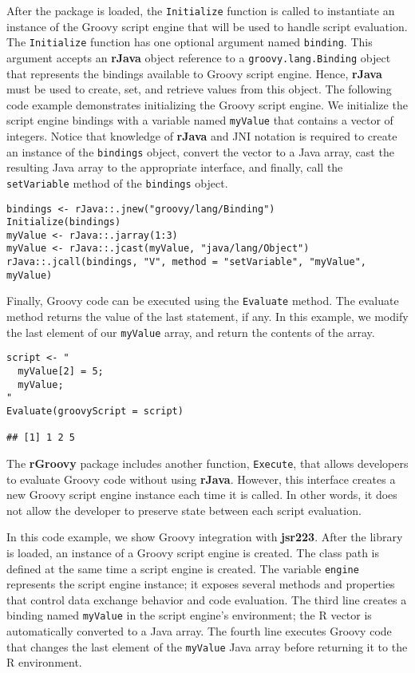 \documentclass[
article,
11pt, %
a4paper, %
oneside, %
headinclude,footinclude, %
]{scrartcl}
\theoremstyle{definition} %
\theoremstyle{plain} %
\theoremstyle{remark} %
\newcommand{\pkg}[1]{\textbf{#1}}
\newcommand{\code}[1]{\texttt{#1}}
\begin{document}
After the package is loaded, the \code{Initialize} function is called to instantiate an instance of the Groovy script engine that will be used to handle script evaluation. The \code{Initialize} function has one optional argument named \code{binding}. This argument accepts an \pkg{rJava} object reference to a \code{groovy.lang.Binding} object that represents the bindings available to Groovy script engine. Hence, \pkg{rJava} must be used to create, set, and retrieve values from this object. The following code example demonstrates initializing the Groovy script engine. We initialize the script engine bindings with a variable named \code{myValue} that contains a vector of integers. Notice that knowledge of \pkg{rJava} and JNI notation is required to create an instance of the \code{bindings} object, convert the vector to a Java array, cast the resulting Java array to the appropriate interface, and finally, call the \code{setVariable} method of the \code{bindings} object.

\begin{verbatim}
bindings <- rJava::.jnew("groovy/lang/Binding")
Initialize(bindings)
myValue <- rJava::.jarray(1:3)
myValue <- rJava::.jcast(myValue, "java/lang/Object")
rJava::.jcall(bindings, "V", method = "setVariable", "myValue", myValue)
\end{verbatim}

Finally, Groovy code can be executed using the \code{Evaluate} method. The evaluate method returns the value of the last statement, if any. In this example, we modify the last element of our \code{myValue} array, and return the contents of the array.

\begin{verbatim}
script <- "
  myValue[2] = 5;
  myValue;
"
Evaluate(groovyScript = script)

## [1] 1 2 5
\end{verbatim}

The \pkg{rGroovy} package includes another function, \code{Execute}, that allows developers to evaluate Groovy code without using \pkg{rJava}. However, this interface creates a new Groovy script engine instance each time it is called. In other words, it does not allow the developer to preserve state between each script evaluation.

In this code example, we show Groovy integration with \pkg{jsr223}. After the library is loaded, an instance of a Groovy script engine is created. The class path is defined at the same time a script engine is created. The variable \code{engine} represents the script engine instance; it exposes several methods and properties that control data exchange behavior and code evaluation. The third line creates a binding named \code{myValue} in the script engine's environment; the R vector is automatically converted to a Java array. The fourth line executes Groovy code that changes the last element of the \code{myValue} Java array before returning it to the R environment.
\end{document}
